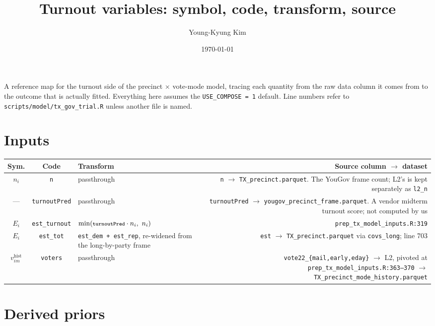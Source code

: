 \documentclass[11pt]{article}
\title{Turnout variables: symbol, code, transform, source}
\author{Young-Kyung Kim}
\date{\today}
\newcommand{\var}[1]{\texttt{\footnotesize #1}}
\newcommand{\file}[1]{\texttt{\footnotesize #1}}
\begin{document}
\maketitle

\noindent
A reference map for the turnout side of the precinct $\times$ vote-mode model, tracing
each quantity from the raw data column it comes from to the outcome that is actually
fitted. Everything here assumes the \var{USE\_COMPOSE = 1} default. Line numbers refer to
\file{scripts/model/tx\_gov\_trial.R} unless another file is named.

\section{Inputs}

\begin{center}\footnotesize
\begin{tabular}{@{}SCTR@{}}
\toprule
\textbf{Sym.} & \textbf{Code} & \textbf{Transform} & \textbf{Source column $\rightarrow$ dataset} \\
\midrule
$n_i$ & \var{n} & passthrough &
  \var{n} $\rightarrow$ \file{TX\_precinct.parquet}. The YouGov frame count; L2's is kept
  separately as \var{l2\_n} \\[4pt]
--- & \var{turnoutPred} & passthrough &
  \var{turnoutPred} $\rightarrow$ \file{yougov\_precinct\_frame.parquet}. A vendor
  midterm turnout score; not computed by us \\[4pt]
$E_i$ & \var{est\_turnout} & $\min(\var{turnoutPred} \cdot n_i,\ n_i)$ &
  \file{prep\_tx\_model\_inputs.R:319} \\[4pt]
$E_i$ & \var{est\_tot} & \var{est\_dem + est\_rep}, re-widened from the long-by-party frame &
  \var{est} $\rightarrow$ \file{TX\_precinct.parquet} via \var{covs\_long}; line 703 \\[4pt]
$v^{\text{hist}}_{im}$ & \var{voters} & passthrough &
  \var{vote22\_\{mail,early,eday\}} $\rightarrow$ L2, pivoted at
  \file{prep\_tx\_model\_inputs.R:363--370} $\rightarrow$
  \file{TX\_precinct\_mode\_history.parquet} \\
\bottomrule
\end{tabular}
\end{center}

\section{Derived priors}
\end{document}
